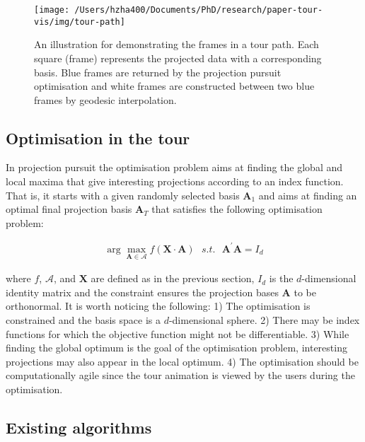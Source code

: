 \begin{Schunk}
\begin{figure}

{\centering \texttt{[image: /Users/hzha400/Documents/PhD/research/paper-tour-vis/img/tour-path]} 

}

\caption[An illustration for demonstrating the frames in a tour path]{An illustration for demonstrating the frames in a tour path. Each square (frame) represents the projected data with a corresponding basis. Blue frames are returned by the projection pursuit optimisation and white frames are constructed between two blue frames by geodesic interpolation.}\label{fig:tour-path}
\end{figure}
\end{Schunk}

\hypertarget{tour-optim}{%
\subsection{Optimisation in the tour}\label{tour-optim}}

In projection pursuit the optimisation problem aims at finding the
global and local maxima that give interesting projections according to
an index function. That is, it starts with a given randomly selected
basis \(\mathbf{A}_1\) and aims at finding an optimal final projection
basis \(\mathbf{A}_T\) that satisfies the following optimisation
problem:

\begin{align}
\arg \max_{\mathbf{A} \in \mathcal{A}} f(\mathbf{X} \cdot \mathbf{A})  ~~~ s.t. ~~~ \mathbf{A}^{\prime} \mathbf{A} = I_d
\end{align}

\noindent where \(f\), \(\mathcal{A}\), and \(\mathbf{X}\) are defined
as in the previous section, \(I_d\) is the \(d\)-dimensional identity
matrix and the constraint ensures the projection bases \(\mathbf{A}\) to
be orthonormal. It is worth noticing the following: 1) The optimisation
is constrained and the basis space is a \(d\)-dimensional sphere. 2)
There may be index functions for which the objective function might not
be differentiable. 3) While finding the global optimum is the goal of
the optimisation problem, interesting projections may also appear in the
local optimum. 4) The optimisation should be computationally agile since
the tour animation is viewed by the users during the optimisation.

\hypertarget{existing-algorithms}{%
\subsection{Existing algorithms}\label{existing-algorithms}}

